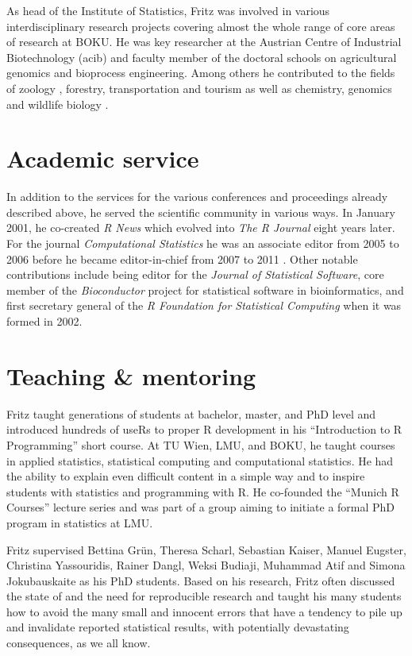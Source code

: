 As head of the Institute of Statistics, Fritz was involved
in various interdisciplinary research projects covering almost the whole
range of core areas of research at BOKU. He was key researcher at the
Austrian Centre of Industrial Biotechnology (acib)
\citep{Scharl+Voglhuber+Leisch:2009, Melcher+Scharl+Leisch:2017} and
faculty member of the doctoral schools on agricultural genomics and
bioprocess engineering. Among others he contributed to the fields of
zoology \citep{Cech:2022}, forestry, transportation and tourism
\citep{Taczanowska:2023} as well as chemistry, genomics and wildlife
biology \citep{Steiner:2014}.

\section{Academic service}\label{academic-service}

In addition to the services for the various conferences and proceedings
already described above, he served the scientific community in various ways.
In January 2001, he co-created \emph{R News} which evolved into
\emph{The R Journal} eight years later. For the journal \emph{Computational Statistics}
he was an associate editor from 2005 to 2006 before he became editor-in-chief
from 2007 to 2011 \citep[see][ for more details]{Symanzik+Mori+Vieu:2024}.
Other notable contributions include being
editor for the \emph{Journal of Statistical Software}, core member of the
\emph{Bioconductor} project for statistical software in bioinformatics, and
first secretary general of the \emph{R Foundation for Statistical Computing} when
it was formed in 2002.

\section{Teaching \& mentoring}\label{teaching-mentoring}

Fritz taught generations of students at bachelor, master, and PhD level and
introduced hundreds of useRs to proper R development in his ``Introduction to
R Programming'' short course. At TU Wien, LMU, and BOKU, he taught courses in applied
statistics, statistical computing and computational statistics. He had the
ability to explain even difficult content in a simple way and to inspire students
with statistics and programming with R. He
co-founded the ``Munich R Courses'' lecture series and was part of a group
aiming to initiate a formal PhD program in statistics at LMU.

Fritz supervised
Bettina Grün, Theresa Scharl,
Sebastian Kaiser, Manuel Eugster,
Christina Yassouridis, Rainer Dangl,
Weksi Budiaji, Muhammad Atif and
Simona Jokubauskaite as his PhD students.
Based on his research, Fritz often discussed the state of and the need for reproducible
research and taught his many students how to avoid the many small and
innocent errors that have a tendency to pile up and invalidate reported
statistical results, with potentially devastating consequences, as we all know.

